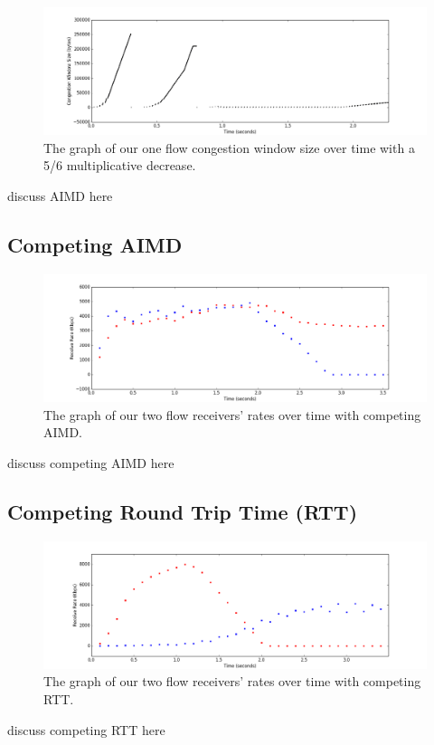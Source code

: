 \documentclass[11pt]{article}
\begin{document}
\begin{figure}[H]
\caption{The graph of our one flow congestion window size over time with a 5/6 multiplicative decrease.}
  \label{figure16}
    \centering
    \includegraphics[width=\linewidth]{1f_windowAIMD.png}
\end{figure}

discuss AIMD here

\subsection{Competing AIMD}

\begin{figure}[H]
\caption{The graph of our two flow receivers' rates over time with competing AIMD.}
  \label{figure15}
    \centering
    \includegraphics[width=\linewidth]{2f_rateAIMD.png}
\end{figure}

discuss competing AIMD here

\subsection{Competing Round Trip Time (RTT)}

\begin{figure}[H]
\caption{The graph of our two flow receivers' rates over time with competing RTT.}
  \label{figure16}
    \centering
    \includegraphics[width=\linewidth]{2f_rate_rtt.png}
\end{figure}

discuss competing RTT here
\end{document}
